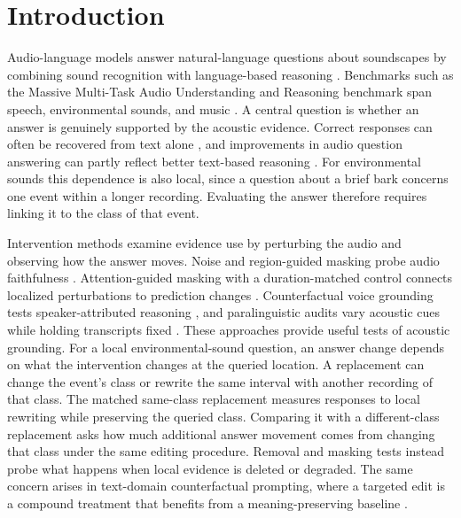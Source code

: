 \section{Introduction}
\label{sec:intro}

Audio-language models answer natural-language questions about soundscapes by
combining sound recognition with language-based reasoning
\cite{qwen25omni2025,funaudiochat2026}. Benchmarks such as the Massive Multi-Task
Audio Understanding and Reasoning benchmark span speech, environmental sounds,
and music \cite{mmau2024}. A central question is whether an answer is genuinely
supported by the acoustic evidence. Correct responses can often be recovered
from text alone \cite{authorship2026impact}, and improvements in audio question
answering can partly reflect better text-based reasoning \cite{omnir1}. For
environmental sounds this dependence is also local, since a question about a
brief bark concerns one event within a longer recording. Evaluating the answer
therefore requires linking it to the class of that event.

Intervention methods examine evidence use by perturbing the audio and observing
how the answer moves. Noise and region-guided masking probe audio faithfulness
\cite{lalmfaith2026}. Attention-guided masking with a duration-matched control
connects localized perturbations to prediction changes \cite{mapo2026}.
Counterfactual voice grounding tests speaker-attributed reasoning
\cite{hear2026whosaidwhat}, and paralinguistic audits vary acoustic cues while
holding transcripts fixed \cite{paraling2026}. These approaches provide useful
tests of acoustic grounding. For a local environmental-sound question, an answer
change depends on what the intervention changes at the queried location. A
replacement can change the event's class or rewrite the same interval with
another recording of that class. The matched same-class replacement measures
responses to local rewriting while preserving the queried class. Comparing it
with a different-class replacement asks how much additional answer movement
comes from changing that class under the same editing procedure. Removal and
masking tests instead probe what happens when local evidence is deleted or
degraded. The same
concern arises in text-domain counterfactual prompting, where a targeted edit
is a compound treatment that benefits from a meaning-preserving baseline
\cite{yang2026compared}.

